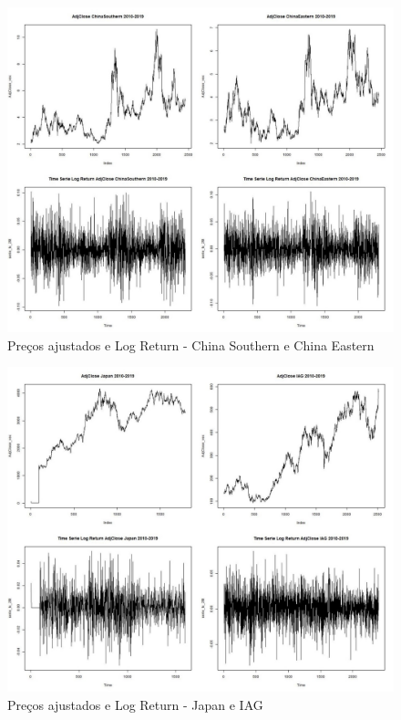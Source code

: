 \documentclass[12pt]{article}
\begin{document}
\begin{figure}[H]
	\centering
	\includegraphics[width=0.8\linewidth]{../Modelos/SeriesCompChina10_19}
	\caption{Preços ajustados e Log Return - China Southern e China Eastern}
	\label{fig:seriescompchina1019}
\end{figure}

\begin{figure}[H]
	\centering
	\includegraphics[width=0.8\linewidth]{../Modelos/SeriesCompJapIAG10_19}
	\caption{Preços ajustados e Log Return - Japan e IAG}
	\label{fig:seriescompjapiag1019}
\end{figure}
\end{document}
